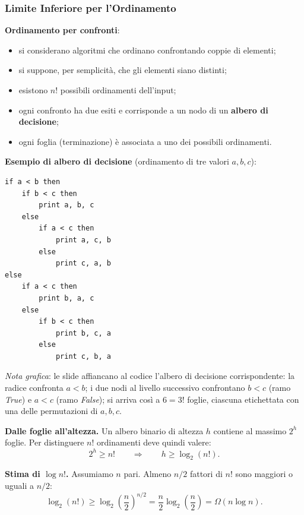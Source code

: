 \documentclass[12pt, a4paper]{article}
\begin{document}
\subsubsection{Limite Inferiore per l'Ordinamento}

\textbf{Ordinamento per confronti}:
\begin{itemize}
    \item si considerano algoritmi che ordinano confrontando coppie di elementi;
    \item si suppone, per semplicità, che gli elementi siano distinti;
    \item esistono $n!$ possibili ordinamenti dell'input;
    \item ogni confronto ha due esiti e corrisponde a un nodo di un \textbf{albero di decisione};
    \item ogni foglia (terminazione) è associata a uno dei possibili ordinamenti.
\end{itemize}

\textbf{Esempio di albero di decisione} (ordinamento di tre valori $a,b,c$):
\begin{verbatim}
if a < b then
    if b < c then
        print a, b, c
    else
        if a < c then
            print a, c, b
        else
            print c, a, b
else
    if a < c then
        print b, a, c
    else
        if b < c then
            print b, c, a
        else
            print c, b, a
\end{verbatim}
\textit{Nota grafica}: le slide affiancano al codice l'albero di decisione corrispondente: la radice confronta $a<b$; i due nodi al livello successivo confrontano $b<c$ (ramo \textit{True}) e $a<c$ (ramo \textit{False}); si arriva così a $6=3!$ foglie, ciascuna etichettata con una delle permutazioni di $a,b,c$.

\begin{tcolorbox}[colback=lightergray!10, colframe=tocsec, title=\textbf{Teorema: Il Limite Inferiore è $\Omega(n\log n)$}]
\label{teo:limite-inferiore-ordinamento}
\textbf{Dalle foglie all'altezza.} Un albero binario di altezza $h$ contiene al massimo $2^h$ foglie. Per distinguere $n!$ ordinamenti deve quindi valere:
$$2^h \ge n! \qquad\Longrightarrow\qquad h \ge \log_2(n!).$$

\textbf{Stima di $\log n!$.} Assumiamo $n$ pari. Almeno $n/2$ fattori di $n!$ sono maggiori o uguali a $n/2$:
$$\log_2(n!) \ge \log_2\left(\frac{n}{2}\right)^{n/2} = \frac{n}{2}\log_2\left(\frac{n}{2}\right) = \Omega(n\log n).$$
\end{tcolorbox}
\end{document}
